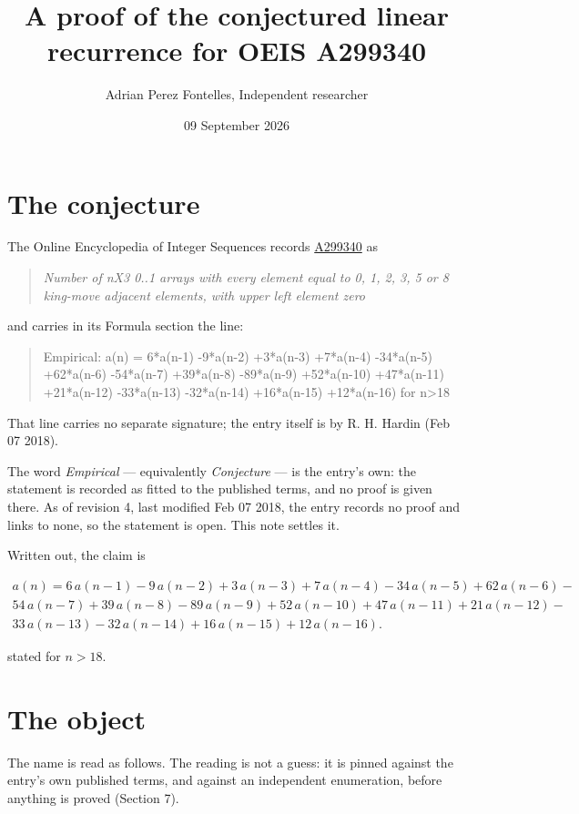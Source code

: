 \documentclass[11pt]{article}
\title{A proof of the conjectured linear recurrence for OEIS A299340}
\author{Adrian Perez Fontelles, Independent researcher}
\date{09 September 2026}
\theoremstyle{definition}
\begin{document}
\maketitle
\section{The conjecture}

The Online Encyclopedia of Integer Sequences records \href{https://oeis.org/A299340}{A299340} as

\begin{quote}\itshape Number of nX3 0..1 arrays with every element equal to 0, 1, 2, 3, 5 or 8 king-move adjacent elements, with upper left element zero\end{quote}

and carries in its Formula section the line:

\begin{quote}\ttfamily Empirical: a(n) = 6*a(n-1) -9*a(n-2) +3*a(n-3) +7*a(n-4) -34*a(n-5) +62*a(n-6) -54*a(n-7) +39*a(n-8) -89*a(n-9) +52*a(n-10) +47*a(n-11) +21*a(n-12) -33*a(n-13) -32*a(n-14) +16*a(n-15) +12*a(n-16) for n>18\end{quote}

That line carries no separate signature; the entry itself is by R. H. Hardin (Feb 07 2018).

The word {\itshape Empirical} --- equivalently {\itshape Conjecture} --- is the entry's own: the statement is recorded as fitted to the published terms, and no proof is given there. As of revision 4, last modified Feb 07 2018, the entry records no proof and links to none, so the statement is open. This note settles it.

Written out, the claim is

\begin{multline*} a(n) = 6\,a(n-1) - 9\,a(n-2) + 3\,a(n-3) + 7\,a(n-4) - 34\,a(n-5) + 62\,a(n-6) - \\ 54\,a(n-7) + 39\,a(n-8) - 89\,a(n-9) + 52\,a(n-10) + 47\,a(n-11) + 21\,a(n-12) - \\ 33\,a(n-13) - 32\,a(n-14) + 16\,a(n-15) + 12\,a(n-16). \end{multline*}

stated for $n > 18$.

\section{The object}

The name is read as follows. The reading is not a guess: it is pinned against the entry's own published terms, and against an independent enumeration, before anything is proved (Section 7).
\end{document}
